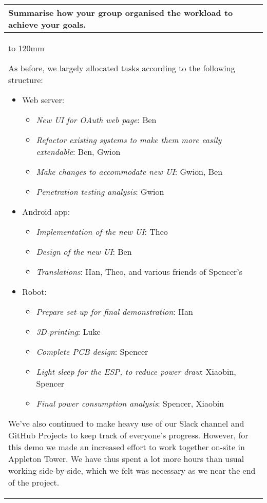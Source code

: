 \documentclass[a4paper]{article}
\newcommand{\colWidth}{141mm}
\begin{document}
\begin{center}
\begin{tabular}{|p{\colWidth}|}
	\hline
	\cellcolor{blue!25}\large
	\textbf{Summarise how your group organised the workload to achieve your goals.}
	\\ \hline
	\vtop to 120mm{
		As before, we largely allocated tasks according to the following structure:
		\begin{itemize}
			\item Web server:
			\begin{itemize}
				\item \textit{New UI for OAuth web page}: Ben
				\item \textit{Refactor existing systems to make them more easily extendable}: Ben, Gwion
				\item \textit{Make changes to accommodate new UI}: Gwion, Ben
				\item \textit{Penetration testing analysis}: Gwion
			\end{itemize}
			\item Android app:
			\begin{itemize}
				\item \textit{Implementation of the new UI}: Theo
				\item \textit{Design of the new UI}: Ben
				\item \textit{Translations}: Han, Theo, and various friends of Spencer's
			\end{itemize}
			\item Robot:
			\begin{itemize}
				\item \textit{Prepare set-up for final demonstration}: Han
				\item \textit{3D-printing}: Luke
				\item \textit{Complete PCB design}: Spencer
				\item \textit{Light sleep for the ESP, to reduce power draw}: Xiaobin, Spencer
				\item \textit{Final power consumption analysis}: Spencer, Xiaobin
			\end{itemize}
		\end{itemize}

		We've also continued to make heavy use of our Slack channel and GitHub Projects to keep track of
		everyone's progress. However, for this demo we made an increased effort to work together on-site in
		Appleton Tower. We have thus spent a lot more hours than usual working side-by-side, which we felt was
		necessary as we near the end of the project.
  }
  \\
  \hline
\end{tabular}
\vskip 5mm


\end{center}
\end{document}
